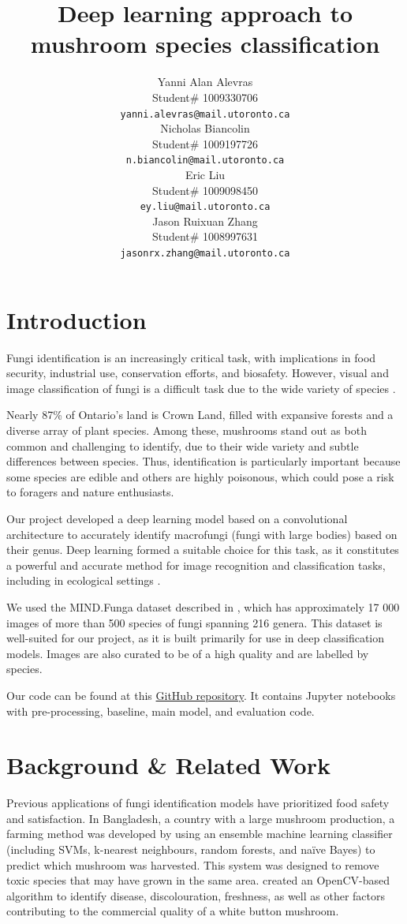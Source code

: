 \documentclass{article} %
\title{Deep learning approach to  \\ 
mushroom species classification}
\author{Yanni Alan Alevras  \\
Student\# 1009330706 \\
\texttt{yanni.alevras@mail.utoronto.ca} \\
\And
Nicholas Biancolin  \\
Student\# 1009197726 \\
\texttt{n.biancolin@mail.utoronto.ca} \\
\AND
Eric Liu  \\
Student\# 1009098450 \\
\texttt{ey.liu@mail.utoronto.ca} \\
\And
Jason Ruixuan Zhang \\
Student\# 1008997631 \\
\texttt{jasonrx.zhang@mail.utoronto.ca} \\
\AND
}
\begin{document}
\maketitle

\section{Introduction}
\label{sec:introduction}

Fungi identification is an increasingly critical task, with implications in food security, industrial use, conservation efforts, and biosafety. However, visual and image classification of fungi is a difficult task due to the wide variety of species \citep{LuckingAimeEtAl.UnambiguousIdentificationFungi.2020}.

Nearly 87\% of Ontario's land is Crown Land, filled with expansive forests and a diverse array of plant species. Among these, mushrooms stand out as both common and challenging to identify, due to their wide variety and subtle differences between species. Thus, identification is particularly important because some species are edible and others are highly poisonous, which could pose a risk to foragers and nature enthusiasts.

Our project developed a deep learning model based on a convolutional architecture to accurately identify macrofungi (fungi with large bodies) based on their genus. Deep learning formed a suitable choice for this task, as it constitutes a powerful and accurate method for image recognition and classification tasks, including in ecological settings \citep{SchneiderTaylorEtAl.PresentFutureApproaches.2019}.

We used the MIND.Funga dataset described in \cite{Drechsler-SantosKarstedtEtAl.MINDFunga.2023}, which has approximately 17 000 images of more than 500 species of fungi spanning 216 genera. This dataset is well-suited for our project, as it is built primarily for use in deep classification models. Images are also curated to be of a high quality and are labelled by species.

Our code can be found at this \href{https://github.com/nbiancolin/convolutional-neural-nuts}{GitHub repository}. It contains Jupyter notebooks with pre-processing, baseline, main model, and evaluation code.

\section{Background \& Related Work}
\label{sec:background}
Previous applications of fungi identification models have prioritized food safety and satisfaction. In Bangladesh, a country with a large mushroom production, a farming method was developed by \cite{RahmanFaruqEtAl.IoTEnabledMushroom.2022} using an ensemble machine learning classifier (including SVMs, k-nearest neighbours, random forests, and naïve Bayes) to predict which mushroom was harvested. This system was designed to remove toxic species that may have grown in the same area. \cite{WangZhengEtAl.AutomaticSortingSystem.2018} created an OpenCV-based algorithm to identify disease, discolouration, freshness, as well as other factors contributing to the commercial quality of a white button mushroom.
\end{document}
